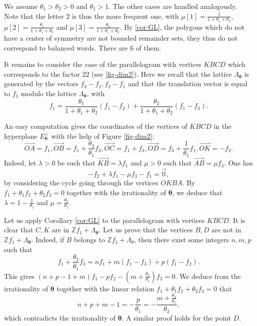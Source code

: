 \documentclass{article}
\theoremstyle{definition}
\newcommand{\btheta}{\boldsymbol{\theta}}
\begin{document}
We assume   $\theta_1>\theta_2>0$ and $\theta_1>1$.  The other cases are handled analogously. Note that the letter $2$ is thus the more frequent one, with 
 $\mu[1]=\frac{1}{1+\theta_1+\theta_2}$, $\mu[2]=\frac{\theta_1}{1+\theta_1+\theta_2}$ and $\mu[3]=\frac{\theta_2}{1+\theta_1+\theta_2}$. 
By  \cref{cor:GL}, the polygons which do not have a center of symmetry  are not bounded remainder sets, they thus do not correspond to balanced words. 
There are 6  of them. 

It remains to consider  the case of  the parallelogram with vertices
 $KBCD$  which corresponds to the factor $22$ (see \cref{fig-dim2}). 
Here we recall that  the lattice $\Lambda_{\btheta}$ is generated by the vectors  $f_3-f_1, f_2-f_1$ and that  the translation vector  is equal to $f_1$ modulo  the lattice $\Lambda_{\btheta}$, with 
  $$f_1=\frac{\theta_1}{1+\theta_1+\theta_2}(f_1-f_2)+\frac{\theta_2}{1+\theta_1+\theta_2}(f_1-f_3).$$

An easy computation gives the coordinates of the vertices   of   $KBCD$ in the hyperplane $E_{\btheta}^\perp$ with the help of Figure \ref{fig-dim2}:
$$\overrightarrow{OA}=f_1, \overrightarrow{OB}=f_1+\frac{\theta_2}{\theta_1} f_3,  \overrightarrow{OC}=f_1+f_3,  \overrightarrow{OD}=f_3+\frac{1}{\theta_1} f_1, \overrightarrow{ OK}=-f_2.  $$ 
Indeed,  let $\lambda>0$ be such that $\overrightarrow{KB}=\lambda f_1$ and $\mu>0$ such that $ \overrightarrow{AB}=\mu f_3$.
One has $$-f_2+\lambda f_1-\mu f_3-f_1=\vec {0},$$ by considering the cycle  going through the vertices $OKBA$.
By  $f_1+\theta_1f_2+\theta_2 f_3=0$   together with the  irrationality of $\btheta$, we deduce
that $\lambda=1-\frac{1}{\theta_1} $ and $\mu=\frac{\theta_2}{\theta_1}$.

Let us  apply Corollary \ref{cor:GL} to the parallelogram with vertices
 $KBCD$.  It is clear that $C, K$ are in $\mathbb Z f_1+\Lambda_{\btheta}$. 
Let us  prove that the vertices $B, D$ are not  in $\mathbb Z f_1+\Lambda_{\btheta}$. Indeed, if  $B$ belongs to $\mathbb Z f_1+\Lambda_{\theta}$, then there exist some integers $n,m,p$ such that 
$$f_1+\frac{\theta_2}{\theta_1}f_3=n f_1+m(f_1-f_3)+p(f_1-f_2).
 $$
 This gives
$(n+p-1+m)f_1-pf_2-(m+\frac{\theta_2}{\theta_1})f_3=0$. We deduce from the irrationality of $\btheta$  together with  the linear relation  $f_1+\theta_1 f_2+\theta_2 f_3=0$  that
$$n+p+m-1=-\frac{p}{\theta_1}=-\frac{m+\frac{\theta_2}{\theta_1}}{\theta_2},$$  which contradicts the irrationality of $\btheta$. A similar proof holds for the  point $D$.
\end{document}
